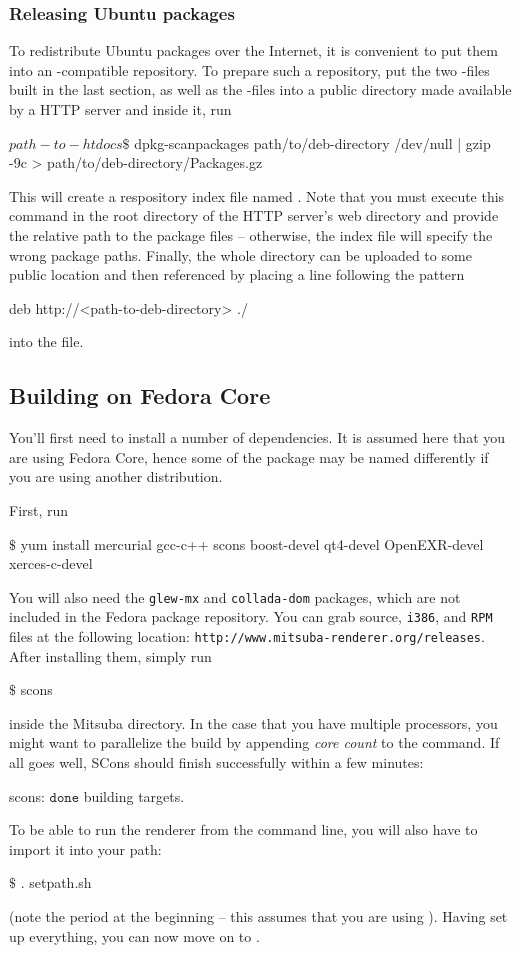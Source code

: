 \subsubsection{Releasing Ubuntu packages}
To redistribute Ubuntu packages over the Internet, it is convenient to 
put them into an -compatible repository. To prepare such a
repository, put the two -files built in the last section, 
as well as the  -files into a public directory 
made available by a HTTP server and inside it, run
\begin{shell}
$path-to-htdocs\text{\$}$ dpkg-scanpackages path/to/deb-directory /dev/null | gzip -9c > path/to/deb-directory/Packages.gz
\end{shell}
This will create a respository index file named .
Note that you must execute this command in the root directory of the
HTTP server's web directory and provide the relative path to the 
package files -- otherwise, the index file will specify the wrong package 
paths. Finally, the whole directory can be uploaded to some public location
and then referenced by placing a line following the pattern
\begin{shell}
deb http://<path-to-deb-directory> ./
\end{shell}
into the  file.

\subsection{Building on Fedora Core}
You'll first need to install a number of dependencies. It is assumed here
that you are using Fedora Core, hence some of the package may be named differently if you are 
using another distribution.

First, run
\begin{shell}
$\text{\$}$ yum install mercurial gcc-c++ scons boost-devel qt4-devel OpenEXR-devel xerces-c-devel
\end{shell}
You will also need the \texttt{glew-mx} and \texttt{collada-dom} packages, which are not included in the Fedora package repository. 
You can grab source, \texttt{i386}, and  \texttt{RPM} files at the following location: \texttt{http://www.mitsuba-renderer.org/releases}.
After installing them, simply run
\begin{shell}
$\text{\$}$ scons
\end{shell}
inside the Mitsuba directory. In the case that you have multiple processors, you might want to parallelize the build by appending \emph{core count} to the command.
If all goes well, SCons should finish successfully within a few minutes:
\begin{shell}
scons: $\texttt{done}$ building targets.
\end{shell}
To be able to run the renderer from the command line, you will also have to import it into your path:
\begin{shell}
$\text{\$}$ . setpath.sh
\end{shell}
(note the period at the beginning -- this assumes that you are using ).
Having set up everything, you can now move on to .

